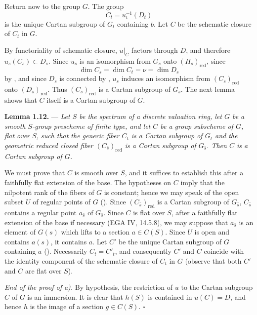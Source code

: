 Return now to the group \(G\). The group
\[
  C_t=u_t^{-1}(D_t)
\]
is the unique Cartan subgroup of \(G_t\) containing \(b\). Let \(C\)
be the schematic closure of \(C_t\) in \(G\).

By functoriality of schematic closure, \(u|_C\) factors through
\(D\), and therefore \(u_s(C_s)\subset D_s\). Since \(u_s\) is an
isomorphism from \(G_s\) onto \((H_s)_{\mathrm{red}}\), since
\[
  \dim C_s=\dim C_t=\nu=\dim D_s
\]
by , and since \(D_s\) is connected by , \(u_s\) induces an
isomorphism from \((C_s)_{\mathrm{red}}\) onto
\((D_s)_{\mathrm{red}}\). Thus \((C_s)_{\mathrm{red}}\) is a Cartan
subgroup of \(G_s\). The next lemma shows that \(C\) itself is a
Cartan subgroup of \(G\).

\medskip
\noindent{}%
\textbf{Lemma 1.12.} --- \textit{Let \(S\) be the spectrum of a
discrete valuation ring, let \(G\) be a smooth \(S\)-group prescheme
of finite type, and let \(C\) be a group subscheme of \(G\), flat
over \(S\), such that the generic fiber \(C_t\) is a Cartan subgroup
of \(G_t\) and the geometric reduced closed fiber
\((C_{\bar s})_{\mathrm{red}}\) is a Cartan subgroup of
\(G_{\bar s}\). Then \(C\) is a Cartan subgroup of \(G\).}

We must prove that \(C\) is smooth over \(S\), and it suffices to
establish this after a faithfully flat extension of the base. The
hypotheses on \(C\) imply that the nilpotent rank of the fibers of
\(G\) is constant; hence we may speak of the open subset \(U\) of
regular points of \(G\) (). Since
\((C_{\bar s})_{\mathrm{red}}\) is a Cartan subgroup of
\(G_{\bar s}\), \(C_{\bar s}\) contains a regular point
\(a_{\bar s}\) of \(G_{\bar s}\). Since \(C\) is flat over \(S\),
after a faithfully flat extension of the base if necessary
(EGA IV, 14.5.8), we may suppose that \(a_{\bar s}\) is an element
of \(G(s)\) which lifts to a section \(a\in C(S)\). Since \(U\) is
open and contains \(a(s)\), it contains \(a\). Let \(C'\) be the
unique Cartan subgroup of \(G\) containing \(a\) ().
Necessarily \(C_t=C'_t\), and consequently \(C'\) and \(C\) coincide
with the identity component of the schematic closure of \(C_t\) in
\(G\) (observe that both \(C'\) and \(C\) are flat over \(S\)).

\smallskip
\noindent\textit{End of the proof of  a).}
By hypothesis, the restriction of \(u\) to the Cartan subgroup \(C\)
of \(G\) is an immersion. It is clear that \(h(S)\) is contained in
\(u(C)=D\), and hence \(h\) is the image of a section \(g\in C(S)\).
\hfill\(\square\)

